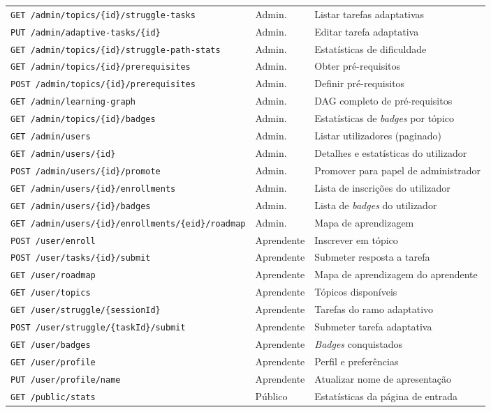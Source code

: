 \begin{table}[ht]
\begin{tabular}{lll}
    \texttt{GET  /admin/topics/\{id\}/struggle-tasks} & Admin. & Listar tarefas adaptativas \\
    \texttt{PUT  /admin/adaptive-tasks/\{id\}}   & Admin. & Editar tarefa adaptativa \\
    \texttt{GET  /admin/topics/\{id\}/struggle-path-stats} & Admin. & Estatísticas de dificuldade \\
    \texttt{GET  /admin/topics/\{id\}/prerequisites}& Admin. & Obter pré-requisitos \\
    \texttt{POST /admin/topics/\{id\}/prerequisites}& Admin. & Definir pré-requisitos \\
    \texttt{GET  /admin/learning-graph}          & Admin. & DAG completo de pré-requisitos \\
    \texttt{GET  /admin/topics/\{id\}/badges}    & Admin. & Estatísticas de \textit{badges} por tópico \\
    \texttt{GET  /admin/users}                   & Admin. & Listar utilizadores (paginado) \\
    \texttt{GET  /admin/users/\{id\}}            & Admin. & Detalhes e estatísticas do utilizador \\
    \texttt{POST /admin/users/\{id\}/promote}    & Admin. & Promover para papel de administrador \\
    \texttt{GET  /admin/users/\{id\}/enrollments}& Admin. & Lista de inscrições do utilizador \\
    \texttt{GET  /admin/users/\{id\}/badges}     & Admin. & Lista de \textit{badges} do utilizador \\
    \texttt{GET  /admin/users/\{id\}/enrollments/\{eid\}/roadmap} & Admin. & Mapa de aprendizagem \\
    \midrule
    \texttt{POST /user/enroll}                   & Aprendente & Inscrever em tópico \\
    \texttt{POST /user/tasks/\{id\}/submit}      & Aprendente & Submeter resposta a tarefa \\
    \texttt{GET  /user/roadmap}                  & Aprendente & Mapa de aprendizagem do aprendente \\
    \texttt{GET  /user/topics}                   & Aprendente & Tópicos disponíveis \\
    \texttt{GET  /user/struggle/\{sessionId\}}   & Aprendente & Tarefas do ramo adaptativo \\
    \texttt{POST /user/struggle/\{taskId\}/submit}& Aprendente & Submeter tarefa adaptativa \\
    \texttt{GET  /user/badges}                   & Aprendente & \textit{Badges} conquistados \\
    \texttt{GET  /user/profile}                  & Aprendente & Perfil e preferências \\
    \texttt{PUT  /user/profile/name}             & Aprendente & Atualizar nome de apresentação \\
    \texttt{GET  /public/stats}                  & Público & Estatísticas da página de entrada \\
    \bottomrule
  \end{tabular}
\end{table}

